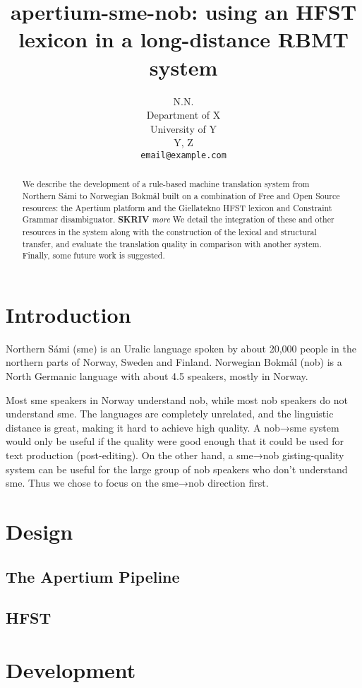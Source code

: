 \documentclass[11pt]{article}
\title{apertium-sme-nob: using an HFST lexicon in a long-distance RBMT system} %
\author{N.N.\\  Department of X \\ University of Y\\  Y, Z \\  {\tt \small   email@example.com} %
}
\newcommand{\comment}[1]{\textbf{SKRIV} {\it #1}}
\begin{document}
\maketitle

  \begin{abstract}
    We describe the development of a rule-based machine translation
    system from Northern Sámi to Norwegian Bokmål built on a
    combination of Free and Open Source resources: the Apertium
    platform and the Giellatekno HFST lexicon and Constraint Grammar
    disambiguator.
    \comment{more}
    We detail the integration of these and other resources in the
    system along with the construction of the lexical and structural
    transfer, and evaluate the translation quality in comparison with
    another system. Finally, some future work is suggested.
  \end{abstract}

\section{Introduction}
Northern Sámi (sme) is an Uralic language spoken by about 20,000
people in the northern parts of Norway, Sweden and Finland. Norwegian
Bokmål (nob) is a North Germanic language with about 4.5 speakers,
mostly in Norway.

Most sme speakers in Norway understand nob, while most nob speakers do
not understand sme. The languages are completely unrelated, and the
linguistic distance is great, making it hard to achieve high quality.
A nob→sme system would only be useful if the quality were good enough
that it could be used for text production (post-editing). On the other
hand, a sme→nob gisting-quality system can be useful for the large
group of nob speakers who don't understand sme. Thus we chose to focus
on the sme→nob direction first.




\section{Design}
 \label{sec:design}
\subsection{The Apertium Pipeline}
\subsection{HFST}


\section{Development}
\end{document}
